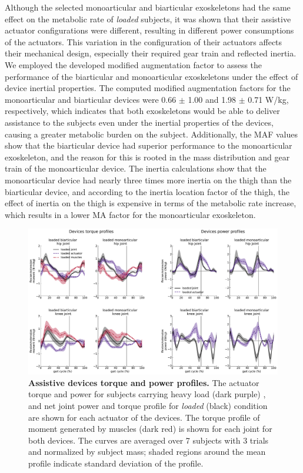 \documentclass[10pt,letterpaper]{article}
\begin{document}
Although the selected monoarticular and biarticular exoskeletons had the same effect on the metabolic rate of {\it loaded} subjects, it was shown that their assistive actuator configurations were different, resulting in different power consumptions of the actuators. This variation in the configuration of their actuators affects their mechanical design, especially their required gear train and reflected inertia. We employed the developed modified augmentation factor to assess the performance of the biarticular and monoarticular exoskeletons under the effect of device inertial properties. The computed modified augmentation factors for the monoarticular and biarticular devices were 0.66 $\pm$ 1.00 and  1.98 $\pm$ 0.71 W/kg, respectively, which indicates that both exoskeletons would be able to deliver assistance to the subjects even under the inertial properties of the devices, causing a greater metabolic burden on the subject. Additionally, the MAF values show that the biarticular device had superior performance to the monoarticular exoskeleton, and the reason for this is rooted in the mass distribution and gear train of the monoarticular device. The inertia calculations show that the monoarticular device had nearly three times more inertia on the thigh than the biarticular device, and according to the inertia location factor of the thigh, the effect of inertia on the thigh is expensive in terms of the metabolic rate increase, which results in a lower MA factor for the monoarticular exoskeleton.\\
\begin{figure}[ht]   
	\centering
	\includegraphics[width=\linewidth]{Case_Studies/LoadedMono04_LoadedBi16/PaperFigure_Profiles.pdf}
	\vspace{1mm}
	\caption{{\small\textbf{Assistive devices torque and power profiles.} The actuator torque and power for subjects carrying heavy load (dark purple) , and net joint power and torque profile for \textit{loaded} (black) condition are shown for each actuator of the devices. The torque profile of moment generated by muscles (dark red) is shown for each joint for both devices. The curves are averaged over 7 subjects with 3 trials and normalized by subject mass; shaded regions around the mean profile indicate standard deviation of the profile.}}
	\label{Fig_Case01_Torque_Power_Profiles}
\end{figure}
\end{document}
